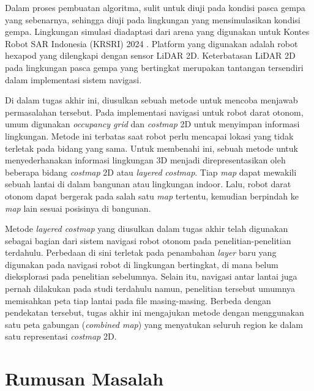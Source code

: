 Dalam proses pembuatan algoritma, sulit untuk diuji pada kondisi pasca gempa yang sebenarnya, sehingga diuji pada lingkungan yang mensimulasikan kondisi gempa. Lingkungan simulasi diadaptasi dari arena yang digunakan untuk Kontes Robot SAR Indonesia (KRSRI) 2024 \parencite{KRI2024Pedoman}. Platform yang digunakan adalah robot hexapod yang dilengkapi dengan sensor LiDAR 2D. Keterbatasan LiDAR 2D pada lingkungan pasca gempa yang bertingkat merupakan tantangan tersendiri dalam implementasi sistem navigasi.

Di dalam tugas akhir ini, diusulkan sebuah metode untuk mencoba menjawab permasalahan tersebut. Pada implementasi navigasi untuk robot darat otonom, umum digunakan \emph{occupancy grid} dan \emph{costmap} 2D untuk menyimpan informasi lingkungan. Metode ini terbatas saat robot perlu mencapai lokasi yang tidak terletak pada bidang yang sama. Untuk membenahi ini, sebuah metode untuk menyederhanakan informasi lingkungan 3D menjadi direpresentasikan oleh beberapa bidang \emph{costmap} 2D atau \emph{layered} \emph{costmap}. Tiap \emph{map} dapat mewakili sebuah lantai di dalam bangunan atau lingkungan indoor. Lalu, robot darat otonom dapat bergerak pada salah satu \emph{map} tertentu, kemudian berpindah ke \emph{map} lain sesuai posisinya di bangunan.

Metode \emph{layered costmap} yang diusulkan dalam tugas akhir telah digunakan sebagai bagian dari sistem navigasi robot otonom pada penelitian-penelitian terdahulu. Perbedaan di sini terletak pada penambahan \emph{layer} baru yang digunakan pada navigasi robot di lingkungan bertingkat, di mana belum dieksplorasi pada penelitian sebelumnya. Selain
itu, navigasi antar lantai juga pernah dilakukan pada studi terdahulu
namun, penelitian tersebut umumnya memisahkan peta tiap lantai pada file masing-masing. Berbeda dengan pendekatan tersebut, tugas akhir ini mengajukan
metode dengan menggunakan satu peta gabungan (\emph{combined map}) yang
menyatukan seluruh region ke dalam satu representasi \emph{costmap} 2D.

\par\vspace{1.2cm}

\section{Rumusan Masalah}
\label{sec:Rumusan Masalah}

